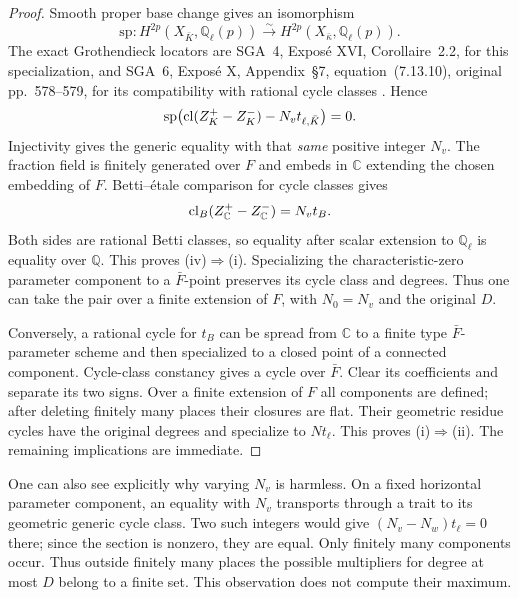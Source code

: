 \documentclass[11pt,a4paper]{article}
\theoremstyle{definition}\newtheorem{definition}[theorem]{Definition}
\theoremstyle{remark}\newtheorem{remark}[theorem]{Remark}
\newcommand{\Q}{\mathbb Q}\newcommand{\Z}{\mathbb Z}\newcommand{\C}{\mathbb C}\newcommand{\R}{\mathbb R}
\begin{document}
\begin{proof}
Smooth proper base change gives an isomorphism
\[
 \mathrm{sp}:H^{2p}(X_{\bar K},\Q_\ell(p))
 \xrightarrow{\sim}H^{2p}(X_{\bar\kappa},\Q_\ell(p)).
\]
The exact Grothendieck locators are SGA~4, Expos\'e XVI, Corollaire~2.2, for this specialization, and SGA~6, Expos\'e X, Appendix~\S7, equation~(7.13.10), original pp.~578--579, for its compatibility with rational cycle classes \citep{SGA4,SGA6}. Hence
\[
 \mathrm{sp}\bigl(\operatorname{cl}(Z_K^+-Z_K^-)-N_vt_{\ell,\bar K}\bigr)=0.
\]
Injectivity gives the generic equality with that \emph{same} positive integer $N_v$. The fraction field is finitely generated over $F$ and embeds in $\C$ extending the chosen embedding of $F$. Betti--\'{e}tale comparison for cycle classes gives
\[
 \cl_B(Z_\C^+-Z_\C^-)=N_vt_B.
\]
Both sides are rational Betti classes, so equality after scalar extension to $\Q_\ell$ is equality over $\Q$. This proves (iv)$\Rightarrow$(i). Specializing the characteristic-zero parameter component to a $\bar F$-point preserves its cycle class and degrees. Thus one can take the pair over a finite extension of $F$, with $N_0=N_v$ and the original $D$.

Conversely, a rational cycle for $t_B$ can be spread from $\C$ to a finite type $\bar F$-parameter scheme and then specialized to a closed point of a connected component. Cycle-class constancy gives a cycle over $\bar F$. Clear its coefficients and separate its two signs. Over a finite extension of $F$ all components are defined; after deleting finitely many places their closures are flat. Their geometric residue cycles have the original degrees and specialize to $Nt_\ell$. This proves (i)$\Rightarrow$(ii). The remaining implications are immediate.
\end{proof}

One can also see explicitly why varying $N_v$ is harmless. On a fixed horizontal parameter component, an equality with $N_v$ transports through a trait to its geometric generic cycle class. Two such integers would give $(N_v-N_w)t_\ell=0$ there; since the section is nonzero, they are equal. Only finitely many components occur. Thus outside finitely many places the possible multipliers for degree at most $D$ belong to a finite set. This observation does not compute their maximum.
\end{document}
